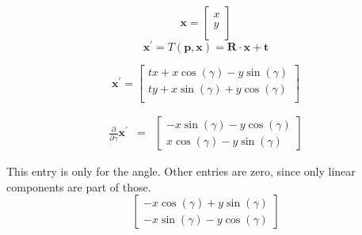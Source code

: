 \documentclass[10pt]{article}
\begin{document}
	\begin{equation*}
	\mathbf{x} = 
	\begin{bmatrix}
	x \\
	y \\
	\end{bmatrix}
	\end{equation*}
	\begin{equation*}
	\mathbf{x^\prime} = T(\mathbf{p}, \mathbf{x}) = \mathbf{R} \cdot \mathbf{x} + \mathbf{t}
	\end{equation*}
	
	\begin{equation*}
	\mathbf{x^\prime} = 
	\begin{bmatrix}
		tx + x \cos{\left (\gamma \right )} - y \sin{\left (\gamma \right )} \\
		ty + x \sin{\left (\gamma \right )} + y \cos{\left (\gamma \right )} \\
	\end{bmatrix}
	\end{equation*}
	
	\begin{eqnarray*}
		\frac{\partial}{\partial \gamma} \mathbf{x^\prime} &=& 
		\left[\begin{matrix}- x \sin{\left (\gamma \right )} - y \cos{\left (\gamma \right )}\\x \cos{\left (\gamma \right )} - y \sin{\left (\gamma \right )}\end{matrix}\right]
	\end{eqnarray*}
	
	This entry is only for the angle. Other entries are zero, since only linear components are part of those.
	\begin{equation*}
	\left[\begin{matrix}- x \cos{\left (\gamma \right )} + y \sin{\left (\gamma \right )}\\- x \sin{\left (\gamma \right )} - y \cos{\left (\gamma \right )}\end{matrix}\right]
	\end{equation*}
\end{document}
